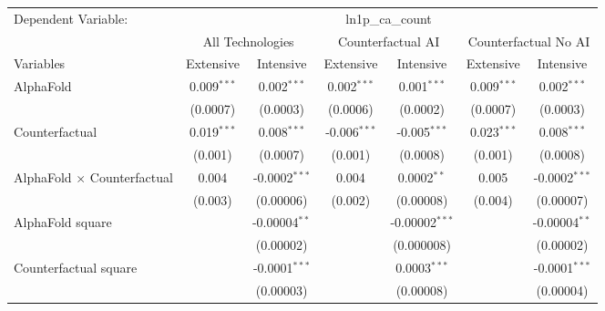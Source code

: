 \begingroup
\centering
\begin{tabular}{lcccccc}
   \tabularnewline \midrule \midrule
   Dependent Variable: & \multicolumn{6}{c}{ln1p\_ca\_count}\\
 & \multicolumn{2}{c}{All Technologies} & \multicolumn{2}{c}{Counterfactual AI} & \multicolumn{2}{c}{Counterfactual No AI} \\
\cmidrule(lr){1-1}\cmidrule(lr){2-3} \cmidrule(lr){4-5} \cmidrule(lr){6-7}
Variables & \multicolumn{1}{c}{Extensive} & \multicolumn{1}{c}{Intensive} & \multicolumn{1}{c}{Extensive} & \multicolumn{1}{c}{Intensive} & \multicolumn{1}{c}{Extensive} & \multicolumn{1}{c}{Intensive} \\
\cmidrule(lr){1-1}\cmidrule(lr){2-2} \cmidrule(lr){3-3} \cmidrule(lr){4-4} \cmidrule(lr){5-5} \cmidrule(lr){6-6} \cmidrule(lr){7-7}
   AlphaFold                          & 0.009$^{***}$ & 0.002$^{***}$      & 0.002$^{***}$  & 0.001$^{***}$      & 0.009$^{***}$ & 0.002$^{***}$\\   
                                      & (0.0007)      & (0.0003)           & (0.0006)       & (0.0002)           & (0.0007)      & (0.0003)\\   
   Counterfactual                     & 0.019$^{***}$ & 0.008$^{***}$      & -0.006$^{***}$ & -0.005$^{***}$     & 0.023$^{***}$ & 0.008$^{***}$\\   
                                      & (0.001)       & (0.0007)           & (0.001)        & (0.0008)           & (0.001)       & (0.0008)\\   
   AlphaFold $\times$ Counterfactual  & 0.004         & -0.0002$^{***}$    & 0.004          & 0.0002$^{**}$      & 0.005         & -0.0002$^{***}$\\   
                                      & (0.003)       & (0.00006)          & (0.002)        & (0.00008)          & (0.004)       & (0.00007)\\   
   AlphaFold square                   &               & -0.00004$^{**}$    &                & -0.00002$^{***}$   &               & -0.00004$^{**}$\\   
                                      &               & (0.00002)          &                & (0.000008)         &               & (0.00002)\\   
   Counterfactual square              &               & -0.0001$^{***}$    &                & 0.0003$^{***}$     &               & -0.0001$^{***}$\\   
                                      &               & (0.00003)          &                & (0.00008)          &               & (0.00004)\\   

\end{tabular}
